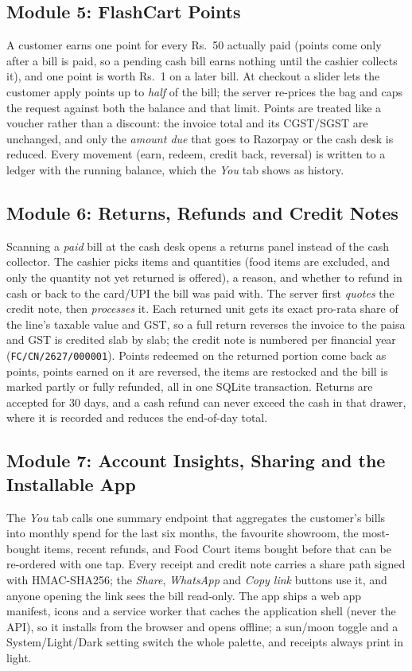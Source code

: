 \documentclass[12pt,letterpaper,twoside,openany]{report}
\begin{document}
\subsection{Module 5: FlashCart Points}
A customer earns one point for every Rs.~50 actually paid (points come only after a bill is
paid, so a pending cash bill earns nothing until the cashier collects it), and one point is
worth Rs.~1 on a later bill. At checkout a slider lets the customer apply points up to
\emph{half} of the bill; the server re-prices the bag and caps the request against both the
balance and that limit. Points are treated like a voucher rather than a discount: the invoice
total and its CGST/SGST are unchanged, and only the \emph{amount due} that goes to Razorpay or
the cash desk is reduced. Every movement (earn, redeem, credit back, reversal) is written to a
ledger with the running balance, which the \emph{You} tab shows as history.

\subsection{Module 6: Returns, Refunds and Credit Notes}
Scanning a \emph{paid} bill at the cash desk opens a returns panel instead of the cash
collector. The cashier picks items and quantities (food items are excluded, and only the
quantity not yet returned is offered), a reason, and whether to refund in cash or back to the
card/UPI the bill was paid with. The server first \emph{quotes} the credit note, then
\emph{processes} it. Each returned unit gets its exact pro-rata share of the line's taxable
value and GST, so a full return reverses the invoice to the paisa and GST is credited slab by
slab; the credit note is numbered per financial year (\texttt{FC/CN/2627/000001}). Points
redeemed on the returned portion come back as points, points earned on it are reversed, the
items are restocked and the bill is marked partly or fully refunded, all in one SQLite
transaction. Returns are accepted for 30 days, and a cash refund can never exceed the cash in
that drawer, where it is recorded and reduces the end-of-day total.

\subsection{Module 7: Account Insights, Sharing and the Installable App}
The \emph{You} tab calls one summary endpoint that aggregates the customer's bills into
monthly spend for the last six months, the favourite showroom, the most-bought items, recent
refunds, and Food Court items bought before that can be re-ordered with one tap. Every receipt
and credit note carries a share path signed with HMAC-SHA256; the \emph{Share}, \emph{WhatsApp}
and \emph{Copy link} buttons use it, and anyone opening the link sees the bill read-only. The
app ships a web app manifest, icons and a service worker that caches the application shell
(never the API), so it installs from the browser and opens offline; a sun/moon toggle and a
System/Light/Dark setting switch the whole palette, and receipts always print in light.
\end{document}
